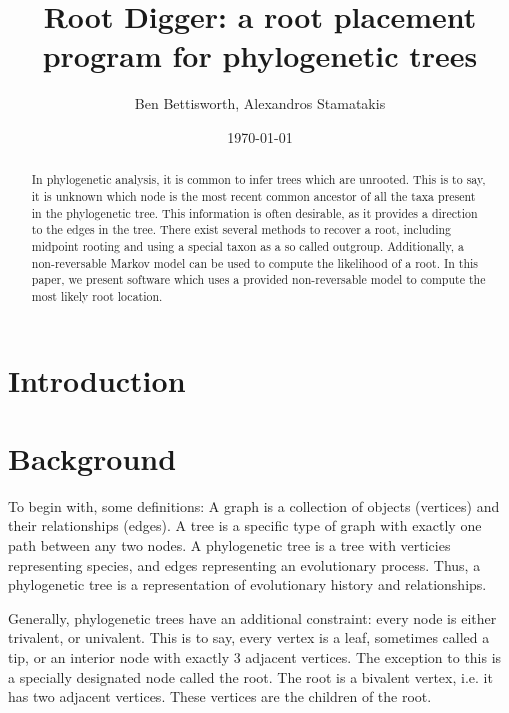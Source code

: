 \documentclass{article}
\title{Root Digger: a root placement program for phylogenetic trees}
\author{Ben Bettisworth, Alexandros Stamatakis}
\date{\today}
\begin{document}
\begin{abstract}
In phylogenetic analysis, it is common to infer trees which are unrooted. This
is to say, it is unknown which node is the most recent common ancestor of all
the taxa present in the phylogenetic tree. This information is often desirable,
as it provides a direction to the edges in the tree.  There exist several
methods to recover a root, including midpoint rooting and using a special taxon
as a so called outgroup. Additionally, a non-reversable Markov model can be used
to compute the likelihood of a root. In this paper, we present software which
uses a provided non-reversable model to compute the most likely root location.
\end{abstract}

\maketitle



\section{Introduction}


\section{Background}


To begin with, some definitions: A graph is a collection of objects (vertices)
and their relationships (edges). A tree is a specific type of graph with exactly
one path between any two nodes. A phylogenetic tree is a tree with verticies
representing species, and edges representing an evolutionary process. Thus, a
phylogenetic tree is a representation of evolutionary history and relationships. 

Generally, phylogenetic trees have an additional constraint: every node is
either trivalent, or univalent. This is to say, every vertex is a leaf,
sometimes called a tip, or an interior node with exactly 3 adjacent vertices.
The exception to this is a specially designated node called the root. The root
is a bivalent vertex, i.e. it has two adjacent vertices. These vertices are the
children of the root.
\end{document}
